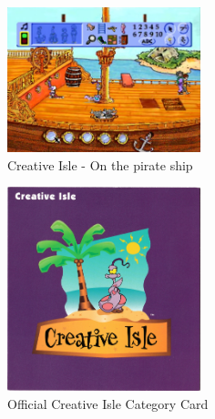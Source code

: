 \begin{figure}[H]
    \centering
    \includegraphics[width=0.5\textwidth]{"./Games/Creative/Images/CreativeIsleScreenshot2.jpg"}
    \caption{Creative Isle - On the pirate ship}
\end{figure}

\begin{figure}[H]
    \centering
    \includegraphics[width=0.5\textwidth]{"./Games/Creative/Images/CreativeIsleOfficialCategoryCard.jpg"}
    \caption{Official Creative Isle Category Card}
\end{figure}